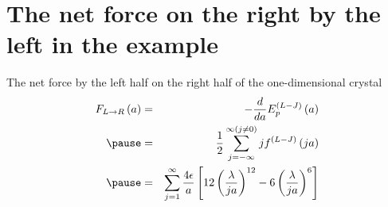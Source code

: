 \documentclass[8pt]{beamer}
\newcommand{\pauseditem}{\pause}
\begin{document}
\section{The net force on the right by the left in the example}

\begin{frame}
{The net force by the left half on the right half of the one-dimensional crystal}
\vspace{-1.2cm}
    \begin{eqnarray}
           F_{L\rightarrow R} \left( a \right) 
           &=&  - \frac{d}{da} E_p^{(L-J)} \left( a \right) \\
           \pauseditem &=& \frac 12 \sum_{ j=-\infty} ^{\infty (j \neq 0)} 
                           j f^{(L-J)} \left(  j a \right) \\
           \pauseditem &=& \sum_{ j=1} ^\infty \frac{4 \epsilon}{a}  
                           \left [ { 12 \left ( \frac{\lambda} 
                           { j a} \right ) }^{12} - 
                           { 6 \left ( \frac{\lambda} { j a} \right ) }^{6} 
                           \right ] 
    \end{eqnarray}
\end{frame}
\end{document}

